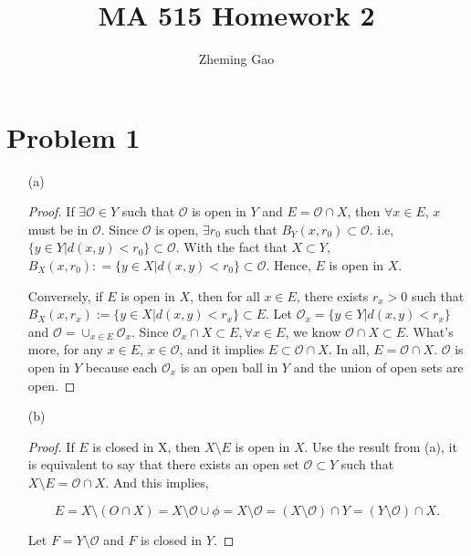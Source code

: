 \documentclass[12pt]{article}
\begin{document}
 
 
\title{MA 515 Homework 2}
\author{Zheming Gao}
\maketitle

\section*{Problem 1}

\begin{enumerate}
\item [(a)]

\begin{proof}

If $\exists \mathcal{O} \in Y$ such that $\mathcal{O}$ is open in $Y$ and $E = \mathcal{O} \cap X$, then $\forall x \in E$, $x$ must be in $\mathcal{O}$. Since $\mathcal{O}$ is open, $\exists r_0$ such that $B_Y(x, r_0) \subset \mathcal{O}$. i.e, $\{y\in Y | d(x, y) < r_0\} \subset \mathcal{O}$. With the fact that $X\subset Y$, $B_X(x, r_0) : = \{ y\in X | d(x, y) < r_0 \} \subset \mathcal{O}$. Hence, $E$ is open in $X$.

Conversely, if $E$ is open in $X$, then for all $x\in E$, there exists $r_x >0$ such that $ B_X(x, r_x) := \{ y\in X | d(x, y) < r_x \} \subset E$. Let $\mathcal O_x = \{ y\in Y | d(x, y) < r_x \}$ and $\mathcal O = \cup_{x\in E} \mathcal O_x$. Since $\mathcal O_x \cap X \subset E, \forall x\in E$, we know $\mathcal O \cap X \subset E$. What's more, for any $x\in E$, $x\in\mathcal O$, and it implies $E\subset \mathcal O\cap X$. In all, $E = \mathcal O\cap X$. $\mathcal O$ is open in $Y$ because each $\mathcal O_x$ is an open ball in $Y$ and the union of open sets are open.

\end{proof}

\item [(b)]

\begin{proof}

If $E$ is closed in X, then $X \setminus E$ is open in $X$. Use the result from (a), it is equivalent to say that there exists an open set $\mathcal{O} \subset Y$ such that $X\setminus E = \mathcal{O} \cap X$. And this implies,

$$
E = X\setminus (O\cap X) = X \setminus \mathcal{O} \cup \phi = X \setminus \mathcal{O} = ( X \setminus \mathcal{O}) \cap Y = (Y\setminus \mathcal{O}) \cap X.
$$

Let $F = Y\setminus \mathcal{O}$ and $F$ is closed in $Y$.

\end{proof}

\end{enumerate}
\end{document}

